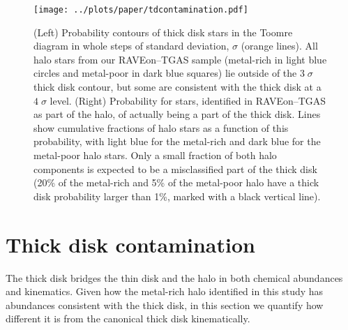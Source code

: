 \documentclass[apj, twocolappendix, numberedappendix, appendixfloats]{emulateapj}
\begin{document}
\begin{figure*}
\begin{center}
\texttt{[image: ../plots/paper/tdcontamination.pdf]}
\caption{(Left) Probability contours of thick disk stars in the Toomre diagram in whole steps of standard deviation, $\sigma$ (orange lines).
All halo stars from our RAVEon--TGAS sample (metal-rich in light blue circles and metal-poor in dark blue squares) lie outside of the $3\;\sigma$ thick disk contour, but some are consistent with the thick disk at a $4\;\sigma$ level.
(Right) Probability for stars, identified in RAVEon--TGAS as part of the halo, of actually being a part of the thick disk.
Lines show cumulative fractions of halo stars as a function of this probability, with light blue for the metal-rich and dark blue for the metal-poor halo stars.
Only a small fraction of both halo components is expected to be a misclassified part of the thick disk (20\% of the metal-rich and 5\% of the metal-poor halo have a thick disk probability larger than 1\%, marked with a black vertical line).}
\label{fig:tdcont}
\end{center}
\end{figure*}




\appendix{}
\section{Thick disk contamination}
\label{sec:tdcontamination}
The thick disk bridges the thin disk and the halo in both chemical abundances and kinematics.
Given how the metal-rich halo identified in this study has abundances consistent with the thick disk, in this section we quantify how different it is from the canonical thick disk kinematically.
\end{document}
